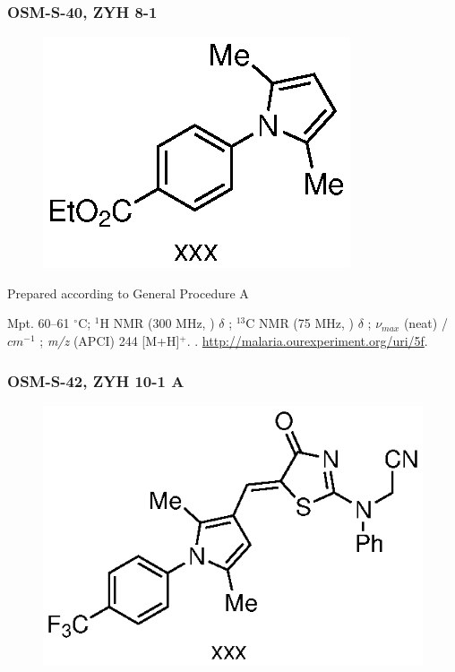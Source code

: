 \documentclass[12pt, a4paper,titlepage]{article}
\begin{document}
{\subsubsection*{OSM-S-40, ZYH 8-1}
\label{exp:ZYH8}
	\begin{figure}[H]
	\begin{center}
	\includegraphics{exp/ZYH8.eps}
	\end{center}
	\vspace{-25pt}	
	\end{figure}

Prepared according to General Procedure A


Mpt. 60--61 $^\circ$C; 
$^1$H NMR (300 MHz, ) $\delta$ ; 
  $^{13}$C NMR (75 MHz, ) $\delta$ ; 
 $\nu_{max}$ (neat) /$cm^{-1}$ ; 
\emph{m/z} (APCI) 244 [M+H]$^+$.
. 
\url{http://malaria.ourexperiment.org/uri/5f}. 

\subsubsection*{OSM-S-42, ZYH 10-1 A}
\label{exp:ZYH10A}
	\begin{figure}[H]
	\begin{center}
	\includegraphics{exp/ZYH10A.eps}
	\end{center}
	\vspace{-25pt}	
	\end{figure}

}
\end{document}
